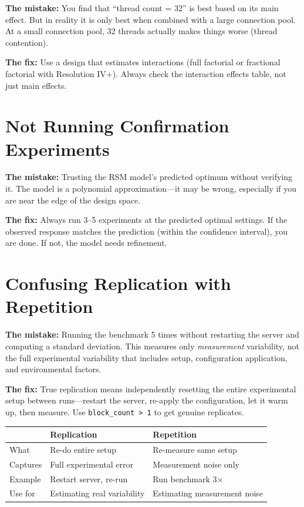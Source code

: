 \documentclass[11pt]{book}
\begin{document}
\textbf{The mistake:} You find that ``thread count = 32'' is best based on its
main effect. But in reality it is only best when combined with a large
connection pool. At a small connection pool, 32 threads actually makes things
worse (thread contention).

\textbf{The fix:} Use a design that estimates interactions (full factorial or
fractional factorial with Resolution IV+). Always check the interaction effects
table, not just main effects.

\section{Not Running Confirmation Experiments}

\textbf{The mistake:} Trusting the RSM model's predicted optimum without
verifying it. The model is a polynomial approximation---it may be wrong,
especially if you are near the edge of the design space.

\textbf{The fix:} Always run 3--5 experiments at the predicted optimal settings.
If the observed response matches the prediction (within the confidence interval),
you are done. If not, the model needs refinement.

\section{Confusing Replication with Repetition}

\textbf{The mistake:} Running the benchmark 5 times without restarting the
server and computing a standard deviation. This measures only \emph{measurement}
variability, not the full experimental variability that includes setup,
configuration application, and environmental factors.

\textbf{The fix:} True replication means independently resetting the entire
experimental setup between runs---restart the server, re-apply the
configuration, let it warm up, then measure. Use \texttt{block\_count > 1} to
get genuine replicates.

\begin{center}
\begin{tabular}{lll}
\toprule
 & Replication & Repetition \\
\midrule
What & Re-do entire setup & Re-measure same setup \\
Captures & Full experimental error & Measurement noise only \\
Example & Restart server, re-run & Run benchmark 3$\times$ \\
Use for & Estimating real variability & Estimating measurement noise \\
\bottomrule
\end{tabular}
\end{center}
\end{document}
